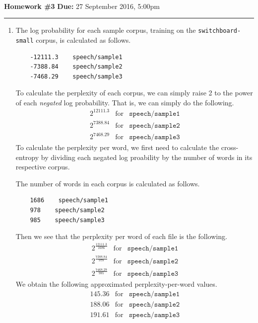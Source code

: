 \documentclass[11pt]{article}
\begin{document}
\\
{{\bf Homework \#3}} \hfill {{\bf Due:} 27 September 2016, 5:00pm} \vspace{6pt} \\
\rule[0.1in]{\textwidth}{0.4pt}

\begin{enumerate}
\item %
	The log probability for each sample corpus, training on the \texttt{switchboard-small} corpus, is calculated as follows.
	\begin{lstlisting}
	-12111.3    speech/sample1
	-7388.84    speech/sample2
	-7468.29    speech/sample3
	\end{lstlisting}
	To calculate the perplexity of each corpus, we can simply raise 2 to the power of each \textit{negated} log probability. That is, we can simply do the following.
	\begin{eqnarray*}
		2^{12111.3} &\text{for}& \texttt{speech/sample1} \\
		2^{7388.84} &\text{for}& \texttt{speech/sample2} \\
		2^{7468.29} &\text{for}& \texttt{speech/sample3}
	\end{eqnarray*}
	To calculate the perplexity per word, we first need to calculate the cross-entropy by dividing each negated log proability by the number of words in its respective corpus.

	The number of words in each corpus is calculated as follows.
	\begin{lstlisting}
	1686    speech/sample1
    978    speech/sample2
    985    speech/sample3
    \end{lstlisting}
    Then we see that the perplexity per word of each file is the following.
    \begin{eqnarray*}
		2^{\frac{12111.3}{1686}} &\text{for}& \texttt{speech/sample1} \\
		2^{\frac{7388.84}{978}} &\text{for}& \texttt{speech/sample2}  \\
		2^{\frac{7468.29}{985}} &\text{for}& \texttt{speech/sample3}
	\end{eqnarray*}
	We obtain the following approximated perplexity-per-word values.
	\begin{eqnarray*}
		145.36 &\text{for}& \texttt{speech/sample1}\\
		188.06 &\text{for}& \texttt{speech/sample2}\\
		191.61 &\text{for}& \texttt{speech/sample3}
	\end{eqnarray*}


\end{enumerate}
\end{document}
